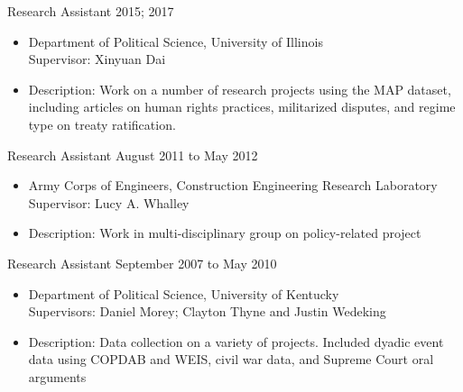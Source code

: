 \documentclass[11pt]{article}
\makeatletter
\newlength{\bibhang}
\newlength{\bibsep}
 {\@listi \global\bibsep\itemsep \global\advance\bibsep by\parsep}
\newenvironment{bibsection}%
        {\begin{enumerate}{}{%
       \setlength{\leftmargin}{\bibhang}%
       \setlength{\itemindent}{-\leftmargin}%
       \setlength{\itemsep}{\bibsep}%
       \setlength{\parsep}{\z@}%
        \setlength{\partopsep}{0pt}%
        \setlength{\topsep}{0pt}}}
        {\end{enumerate}\vspace{-.6\baselineskip}}
\renewcommand{\section}[1]{\pagebreak[3]%
    \hyphenpenalty=10000%
    \vspace{1.3\baselineskip}%
    \phantomsection\addcontentsline{toc}{section}{#1}%
    \noindent\llap{\scshape\smash{\parbox[t]{\marginparwidth}{\raggedright #1}}}%
    \vspace{-\baselineskip}\par}
\newenvironment{innerlist}[1][\enskip\textbullet]%
        {\begin{itemize}[#1,leftmargin=*,parsep=0pt,itemsep=0pt,topsep=0pt,partopsep=0pt]}
        {\end{itemize}}
\makeatother
\begin{document}
\vspace{4mm}

{Research Assistant} \hfill {2015; 2017}
\begin{innerlist}
	
	\item[] Department of Political Science, University of Illinois\\
	Supervisor: Xinyuan Dai
	\item[] Description: Work on a number of research projects using the MAP dataset, including articles on human rights practices, militarized disputes, and regime type on treaty ratification. 
\end{innerlist}

\vspace{4mm}

{Research Assistant} \hfill {August 2011 to May 2012}
\begin{innerlist}

\item[] Army Corps of Engineers, Construction Engineering Research Laboratory \\
        Supervisor: Lucy A. Whalley
        		\item[] Description: Work in multi-disciplinary group on policy-related project
\end{innerlist}
        	
\vspace{4mm}
        	
{Research Assistant} \hfill {September 2007 to May 2010}
\begin{innerlist}

\item[] Department of Political Science, University of Kentucky\\
        Supervisors: Daniel Morey; Clayton Thyne and Justin Wedeking
        \item[] Description: Data collection on a variety of projects. Included dyadic event data using COPDAB and WEIS, civil war data, and Supreme Court oral arguments
\end{innerlist}


\end{document}

